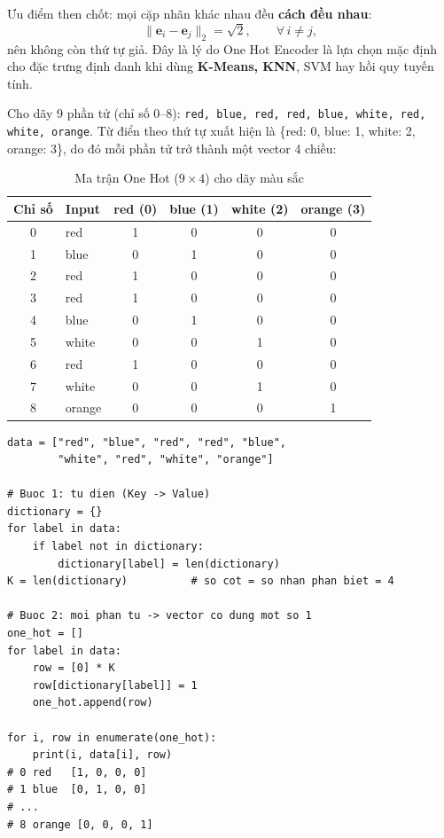 Ưu điểm then chốt: mọi cặp nhãn khác nhau đều \textbf{cách đều nhau}:
\begin{equation}
    \| \mathbf{e}_i - \mathbf{e}_j \|_2 = \sqrt{2}, \qquad \forall\, i \neq j ,
\end{equation}
nên không còn thứ tự giả. Đây là lý do One Hot Encoder là lựa chọn mặc định cho đặc trưng định danh khi dùng \textbf{K-Means, KNN}, SVM hay hồi quy tuyến tính.

\begin{example}
Cho dãy 9 phần tử (chỉ số 0--8): \texttt{red, blue, red, red, blue, white, red, white, orange}. Từ điển theo thứ tự xuất hiện là \{red: 0, blue: 1, white: 2, orange: 3\}, do đó mỗi phần tử trở thành một vector 4 chiều:
\end{example}

\begin{table}[H]
\centering
\begin{tabular}{|c|l|c|c|c|c|}
\hline
\textbf{Chỉ số} & \textbf{Input} & \textbf{red (0)} & \textbf{blue (1)} & \textbf{white (2)} & \textbf{orange (3)} \\
\hline
0 & red    & 1 & 0 & 0 & 0 \\ \hline
1 & blue   & 0 & 1 & 0 & 0 \\ \hline
2 & red    & 1 & 0 & 0 & 0 \\ \hline
3 & red    & 1 & 0 & 0 & 0 \\ \hline
4 & blue   & 0 & 1 & 0 & 0 \\ \hline
5 & white  & 0 & 0 & 1 & 0 \\ \hline
6 & red    & 1 & 0 & 0 & 0 \\ \hline
7 & white  & 0 & 0 & 1 & 0 \\ \hline
8 & orange & 0 & 0 & 0 & 1 \\ \hline
\end{tabular}
\caption{Ma trận One Hot ($9 \times 4$) cho dãy màu sắc}
\label{tab:onehot}
\end{table}


\begin{lstlisting}[caption={Tự cài đặt One Hot Encoder bằng list, for và dictionary}]
data = ["red", "blue", "red", "red", "blue",
        "white", "red", "white", "orange"]

# Buoc 1: tu dien (Key -> Value)
dictionary = {}
for label in data:
    if label not in dictionary:
        dictionary[label] = len(dictionary)
K = len(dictionary)          # so cot = so nhan phan biet = 4

# Buoc 2: moi phan tu -> vector co dung mot so 1
one_hot = []
for label in data:
    row = [0] * K
    row[dictionary[label]] = 1
    one_hot.append(row)

for i, row in enumerate(one_hot):
    print(i, data[i], row)
# 0 red   [1, 0, 0, 0]
# 1 blue  [0, 1, 0, 0]
# ...
# 8 orange [0, 0, 0, 1]
\end{lstlisting}

